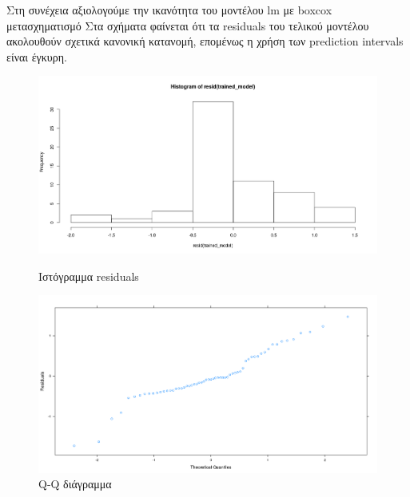 \documentclass[]{article}
\numberwithin{equation}{section}		%
\numberwithin{figure}{section}			%
\numberwithin{table}{section}				%
\begin{document}
   Στη συνέχεια αξιολογούμε την ικανότητα του μοντέλου lm με boxcox μετασχηματισμό 
   Στα σχήματα φαίνεται ότι τα residuals του τελικού μοντέλου ακολουθούν σχετικά κανονική κατανομή, επομένως η χρήση των prediction intervals είναι έγκυρη.
   
   \begin{figure}[!htb]
   	\centering
   	\begin{minipage}{.5\textwidth}
   		\centering
   		\includegraphics[width=\linewidth, height=0.2\textheight]{lm_trans_res_box}
   		\caption{Ιστόγραμμα residuals}
   		\label{fig:1}
   	\end{minipage}%
   	\begin{minipage}{0.5\textwidth}
   		\centering
   		\includegraphics[width=\linewidth, height=0.2\textheight]{lm_trans_resid_qq}
   		\caption{Q-Q διάγραμμα}
   		\label{fig: 2}
   	\end{minipage}
   \end{figure}
   
\end{document}

